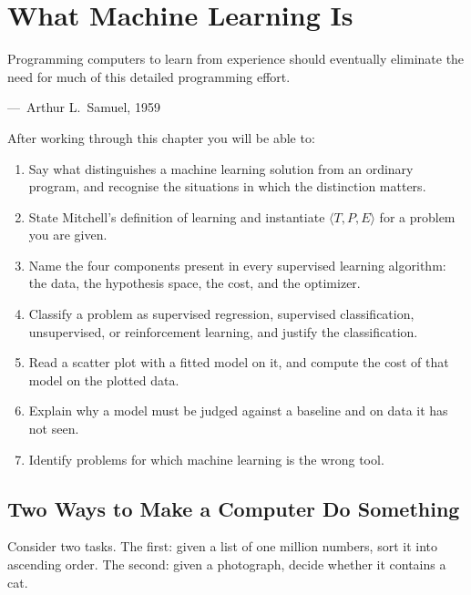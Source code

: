 
\chapter{What Machine Learning Is}
\label{ch:ch01}

\epigraph{Programming computers to learn from experience should eventually
eliminate the need for much of this detailed programming effort.}%
{---\ Arthur L.\ Samuel, 1959}

\begin{chapterlearning}
After working through this chapter you will be able to:
\begin{enumerate}
  \item Say what distinguishes a machine learning solution from an ordinary
        program, and recognise the situations in which the distinction matters.
  \item State Mitchell's definition of learning and instantiate
        $\langle T, P, E\rangle$ for a problem you are given.
  \item Name the four components present in every supervised learning
        algorithm: the data, the hypothesis space, the cost, and the optimizer.
  \item Classify a problem as supervised regression, supervised
        classification, unsupervised, or reinforcement learning, and justify
        the classification.
  \item Read a scatter plot with a fitted model on it, and compute the cost of
        that model on the plotted data.
  \item Explain why a model must be judged against a baseline and on data it
        has not seen.
  \item Identify problems for which machine learning is the wrong tool.
\end{enumerate}
\end{chapterlearning}

\section{Two Ways to Make a Computer Do Something}
\label{sec:two-ways}

Consider two tasks. The first: given a list of one million numbers, sort it into
ascending order. The second: given a photograph, decide whether it contains a
cat.

